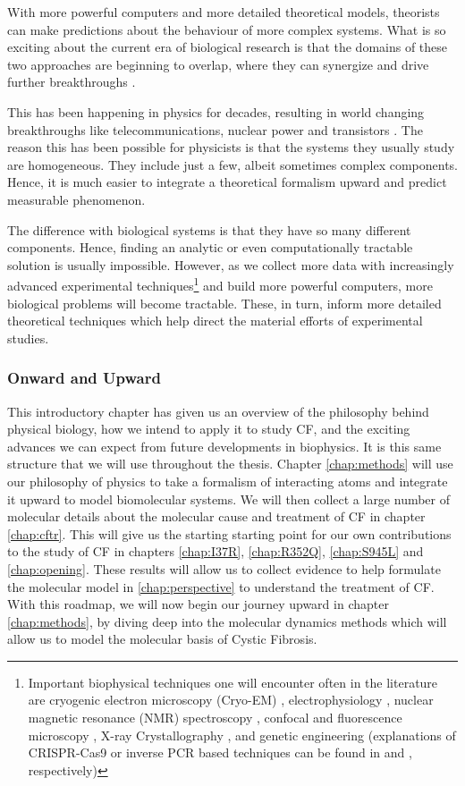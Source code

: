 With more powerful computers and more detailed theoretical models, theorists can make predictions about the behaviour of more complex systems. What is so exciting about the current era of biological research is that the domains of these two approaches are beginning to overlap, where they can synergize and drive further breakthroughs \cite{anonymous2019}.

This has been happening in physics for decades, resulting in world changing breakthroughs like telecommunications, nuclear power and transistors \cite{wu2009}. The reason this has been possible for physicists is that the systems they usually study are homogeneous. They include just a few, albeit sometimes complex components. Hence, it is much easier to integrate a theoretical formalism upward and predict measurable phenomenon. 

The difference with biological systems is that they have so many different components. Hence, finding an analytic or even computationally tractable solution is usually impossible. However, as we collect more data with increasingly advanced experimental techniques\footnote{Important biophysical techniques one will encounter often in the literature are cryogenic electron microscopy (Cryo-EM) \cite{cheng2015, callaway2015, callaway2020}, electrophysiology \cite{aidley1996}, nuclear magnetic resonance (NMR) spectroscopy \cite{marion2013}, confocal and fluorescence microscopy \cite{sanderson2014}, X-ray Crystallography \cite{frauenfelder2010, drenth2006}, and genetic engineering (explanations of CRISPR-Cas9 or inverse PCR based techniques can be found in \cite{silva2017} and \cite{crispr2019}, respectively)} and build more powerful computers, more biological problems will become tractable. These, in turn, inform more detailed theoretical techniques which help direct the material efforts of experimental studies. 

\subsubsection{Onward and Upward}

This introductory chapter has given us an overview of the philosophy behind physical biology, how we intend to apply it to study CF, and the exciting advances we can expect from future developments in biophysics. It is this same structure that we will use throughout the thesis. Chapter \ref{chap:methods} will use our philosophy of physics to take a formalism of interacting atoms and integrate it upward to model biomolecular systems. We will then collect a large number of molecular details about the molecular cause and treatment of CF in chapter \ref{chap:cftr}. This will give us the starting starting point for our own contributions to the study of CF in chapters \ref{chap:I37R}, \ref{chap:R352Q}, \ref{chap:S945L} and \ref{chap:opening}. These results will allow us to collect evidence to help formulate the molecular model in \ref{chap:perspective} to understand the treatment of CF. With this roadmap, we will now begin our journey upward in chapter \ref{chap:methods}, by diving deep into the molecular dynamics methods which will allow us to model the molecular basis of Cystic Fibrosis.

